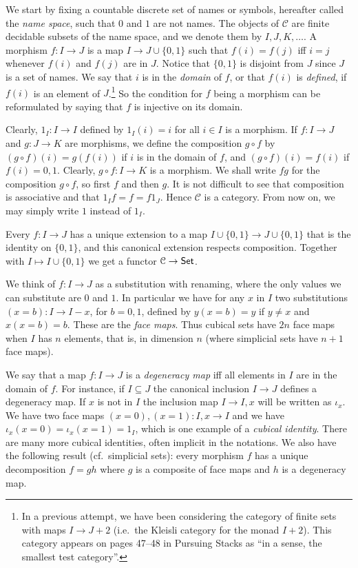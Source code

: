 \documentclass[a4paper,USenglish,draft]{lipics}
\newcommand{\CC}{{\mathcal C}}
\newcommand{\set}[1]{\{#1\}}
\begin{document}
We start by fixing a countable discrete set of names or symbols,
hereafter called the \emph{name space}, such that $0$ and $1$ are not
names.  The objects of $\CC$ are finite decidable subsets of the name
space, and we denote them by $I,J,K,\dots$.  A morphism $f:I\to J$ is
a map $I \to J\cup \set{0,1}$ such that $f(i) = f(j)$ if{f} $i=j$
whenever $f(i)$ and $f(j)$ are in $J$. Notice that $\set{0,1}$ is
disjoint from $J$ since $J$ is a set of names. We say that $i$ is in
the \emph{domain} of $f$, or that $f(i)$ is \emph{defined}, if $f(i)$
is an element of $J$.\footnote%
{In a previous attempt, we have been considering the category of
  finite sets with maps $I \to J+2$ (i.e.\ the Kleisli category for
  the monad $I+2$).  This category appears on pages 47--48 in Pursuing
  Stacks \cite{Grothendieck} as ``in a sense, the smallest test
  category''.}  So the condition for $f$ being a morphism can be
reformulated by saying that $f$ is injective on its domain.

Clearly, $1_I : I\to I$ defined by $1_I(i) = i$ for all $i\in I$ is a
morphism.  If $f:I\to J$ and $g:J\to K$ are morphisms, we define the
composition $g\circ f$ by $(g\circ f)(i) = g(f(i))$ if $i$ is in the
domain of $f$, and $(g\circ f)(i) = f(i)$ if $f(i)= 0,1$.  Clearly,
$g\circ f: I\to K$ is a morphism.  We shall write $fg$ for the
composition $g\circ f$, so first $f$ and then $g$.  It is not
difficult to see that composition is associative and that $1_I f = f =
f 1_J$.  Hence $\CC$ is a category. From now on, we may simply write
$1$ instead of $1_I$.

Every $f:I\to J$ has a unique extension to a map $I \cup \set{0,1} \to
J\cup \set{0,1}$ that is the identity on $\set{0,1}$, and this
canonical extension respects composition.  Together with $I\mapsto I
\cup \set{0,1}$ we get a functor $\CC\to{\sf Set}$.

We think of $f:I\to J$ as a substitution with renaming, where the only
values we can substitute are $0$ and $1$.  In particular we have for
any $x$ in $I$ two substitutions $(x=b):I\to I-x$, for $b=0,1$,
defined by $y(x=b) = y$ if $y\neq x$ and $x(x=b) = b$. These are the
\emph{face maps}.  Thus cubical sets have $2n$ face maps when $I$ has
$n$ elements, that is, in dimension $n$ (where simplicial sets have
$n+1$ face maps).

We say that a map $f:I\to J$ is a {\em degeneracy map} if{f} all
elements in $I$ are in the domain of $f$. For instance, if $I\subseteq
J$ the canonical inclusion $I \to J$ defines a degeneracy map. If $x$
is not in $I$ the inclusion map $I \to I,x$ will be written as
$\iota_x.$ We have two face maps $(x=0), (x=1):I,x\to I$ and we have
$\iota_x(x=0) = \iota_x(x=1) = 1_I$, which is one example of a
\emph{cubical identity}.  There are many more cubical identities,
often implicit in the notations. We also have the following result
(cf.\ simplicial sets): every morphism $f$ has a unique decomposition
$f=gh$ where $g$ is a composite of face maps and $h$ is a degeneracy
map.
\end{document}
